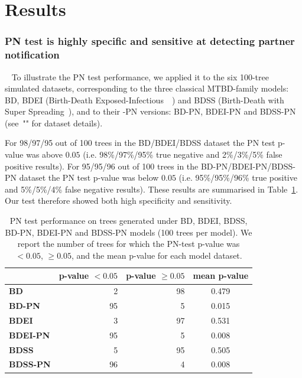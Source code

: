 \documentclass[10pt,letterpaper]{article}
\begin{document}
\section*{Results}


\subsubsection*{PN test is highly specific and sensitive at detecting partner notification}~\label{sec:test:sim}
To illustrate the PN test performance, we applied it to the six 100-tree simulated datasets, corresponding to the three classical MTBD-family models: BD, BDEI (Birth-Death Exposed-Infectious~~\cite{Stadler2014}) and BDSS (Birth-Death with Super Spreading~\cite{Stadler2013a}), and to their -PN versions: BD-PN, BDEI-PN and BDSS-PN (see~"" for dataset details).

For 98/97/95 out of 100 trees in the BD/BDEI/BDSS dataset the PN test p-value was above $0.05$ (i.e. 98\%/97\%/95\% true negative and 2\%/3\%/5\% false positive results). For 95/95/96 out of 100 trees in the BD-PN/BDEI-PN/BDSS-PN dataset the PN test p-value was below $0.05$ (i.e. 95\%/95\%/96\% true positive and 5\%/5\%/4\% false negative results). These results are summarised in Table~\ref{tbl:pntest}. Our test therefore showed both high specificity and sensitivity.

\begin{table}[!h]\centering
\small
\caption{PN test performance on trees generated under BD, BDEI, BDSS, BD-PN, BDEI-PN and BDSS-PN models (100 trees per model). We report the number of trees for which the PN-test p-value was $<0.05$, $\geq 0.05$, and the mean p-value for each model dataset.}
\begin{tabular}{l|r|r|c}
 & \textbf{p-value $<0.05$} & \textbf{p-value $\geq0.05$} & \textbf{mean p-value} \\
  \midrule
\textbf{BD}& 2 & 98 & 0.479 \\
\textbf{BD-PN}& 95 & 5 & 0.015 \\
  \midrule
\textbf{BDEI}& 3 & 97 & 0.531 \\
\textbf{BDEI-PN}& 95 & 5 & 0.008 \\
  \midrule
\textbf{BDSS}& 5 & 95 & 0.505 \\
\textbf{BDSS-PN}& 96 & 4 & 0.008 \\
\end{tabular}
\label{tbl:pntest}
\end{table}
\end{document}
